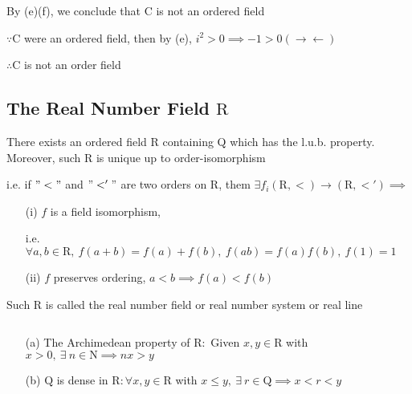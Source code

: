 \newpage

\begin{rmk*}
	By (e)(f), we conclude that $\mathrm{C}$ is not an ordered field
	
	$\because \mathrm{C}$ were an ordered field, then by (e), $i^2>0 \implies -1 > 0(\rightarrow\leftarrow)$
	
	$\therefore \mathrm{C}$ is not an order field
\end{rmk*}


\subsection{The Real Number Field $\mathrm{R}$}

\begin{thm*}
	There exists an ordered field $\mathrm{R}$ containing $\mathrm{Q}$ which has the l.u.b. property. Moreover, such $\mathrm{R}$ is unique up to order-isomorphism
	
	i.e. if $"<"$ and $"<'"$ are two orders on $\mathrm{R}$, them $\exists f_i(\mathrm{R},<) \rightarrow (\mathrm{R},<') \implies$
	
	\begin{enumerate}
		\item[(i)] $f$ is a field isomorphism,
		
		 i.e. $\forall a,b \in \mathrm{R},~f(a+b)=f(a)+f(b),~f(ab) = f(a)f(b),~f(1)=1$
		\item[(ii)] $f$ preserves ordering, $a<b \implies f(a) < f(b)$ 
	\end{enumerate}
	
	Such $\mathrm{R}$ is called the real number field or real number system or real line
\end{thm*}

\begin{thm*}$ $
	\begin{enumerate}
		\item[\color{red}(a)] The Archimedean  property of $\mathrm{R}:$ Given $x,y \in \mathrm{R}$ with $x>0,~\exists~n \in \mathrm{N} \implies nx>y$
		\item[(b)] $\mathrm{Q}$ is dense in $\mathrm{R}: \forall x,y\in \mathrm{R}$ with $x \leq y,~\exists ~r \in \mathrm{Q} \implies x < r < y$
	\end{enumerate}
\end{thm*}

